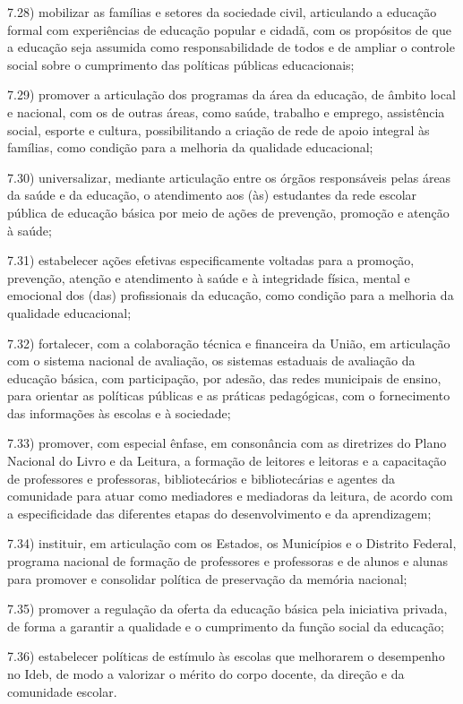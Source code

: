 \documentclass[
]{book}
\begin{document}
7.28) mobilizar as famílias e setores da sociedade civil, articulando a educação formal com experiências de educação popular e cidadã, com os propósitos de que a educação seja assumida como responsabilidade de todos e de ampliar o controle social sobre o cumprimento das políticas públicas educacionais;

7.29) promover a articulação dos programas da área da educação, de âmbito local e nacional, com os de outras áreas, como saúde, trabalho e emprego, assistência social, esporte e cultura, possibilitando a criação de rede de apoio integral às famílias, como condição para a melhoria da qualidade educacional;

7.30) universalizar, mediante articulação entre os órgãos responsáveis pelas áreas da saúde e da educação, o atendimento aos (às) estudantes da rede escolar pública de educação básica por meio de ações de prevenção, promoção e atenção à saúde;

7.31) estabelecer ações efetivas especificamente voltadas para a promoção, prevenção, atenção e atendimento à saúde e à integridade física, mental e emocional dos (das) profissionais da educação, como condição para a melhoria da qualidade educacional;

7.32) fortalecer, com a colaboração técnica e financeira da União, em articulação com o sistema nacional de avaliação, os sistemas estaduais de avaliação da educação básica, com participação, por adesão, das redes municipais de ensino, para orientar as políticas públicas e as práticas pedagógicas, com o fornecimento das informações às escolas e à sociedade;

7.33) promover, com especial ênfase, em consonância com as diretrizes do Plano Nacional do Livro e da Leitura, a formação de leitores e leitoras e a capacitação de professores e professoras, bibliotecários e bibliotecárias e agentes da comunidade para atuar como mediadores e mediadoras da leitura, de acordo com a especificidade das diferentes etapas do desenvolvimento e da aprendizagem;

7.34) instituir, em articulação com os Estados, os Municípios e o Distrito Federal, programa nacional de formação de professores e professoras e de alunos e alunas para promover e consolidar política de preservação da memória nacional;

7.35) promover a regulação da oferta da educação básica pela iniciativa privada, de forma a garantir a qualidade e o cumprimento da função social da educação;

7.36) estabelecer políticas de estímulo às escolas que melhorarem o desempenho no Ideb, de modo a valorizar o mérito do corpo docente, da direção e da comunidade escolar.
\end{document}
